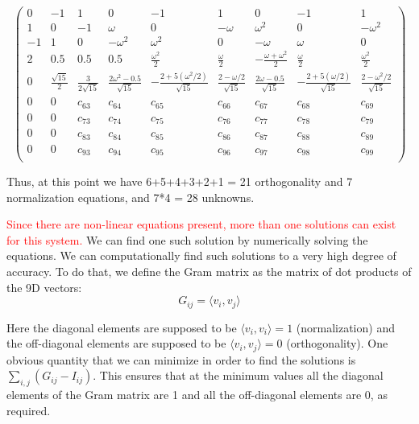 \documentclass{article}
\begin{document}
\[
\begin{pmatrix}
0 & -1 & 1 & 0 & -1 & 1 & 0 & -1 & 1 \\
1 & 0 & -1 & \omega & 0 & -\omega & \omega^2 & 0 & -\omega^2 \\
-1 & 1 & 0 & -\omega^2 & \omega^2 & 0 & -\omega & \omega & 0 \\
2 & 0.5 & 0.5 & 0.5 & \frac{\omega^2}{2} & \frac{\omega}{2} & -\frac{\omega + \omega^2}{2} & \frac{\omega}{2} & \frac{\omega^2}{2} \\
0 & \frac{\sqrt{15}}{2} & \frac{3}{2\sqrt{15}} & \frac{2\omega^2 - 0.5}{\sqrt{15}} & -\frac{2 + 5(\omega^2 / 2)}{\sqrt{15}} & \frac{2 - \omega / 2}{\sqrt{15}} & \frac{2\omega - 0.5}{\sqrt{15}} & -\frac{2 + 5(\omega / 2)}{\sqrt{15}} & \frac{2 - \omega^2 / 2}{\sqrt{15}} \\
0 & 0 & c_{63} & c_{64} & c_{65} & c_{66} & c_{67} & c_{68} & c_{69} \\
0 & 0 & c_{73} & c_{74} & c_{75} & c_{76} & c_{77} & c_{78} & c_{79} \\
0 & 0 & c_{83} & c_{84} & c_{85} & c_{86} & c_{87} & c_{88} & c_{89} \\
0 & 0 & c_{93} & c_{94} & c_{95} & c_{96} & c_{97} & c_{98} & c_{99} \\
\end{pmatrix}
\]




Thus, at this point we have 6+5+4+3+2+1 = 21 orthogonality and 7 normalization equations, and 7*4 = 28 unknowns.

\textcolor{red}{Since there are non-linear equations present, more than one solutions can exist for this system.} We can find one such solution
by numerically solving the equations. We can computationally find such solutions to a very high degree of accuracy. To do that, we define the Gram 
matrix as the matrix of dot products of the 9D vectors:
\begin{equation}
    G_{ij} = \langle v_i, v_j \rangle
\end{equation}

Here the diagonal elements are supposed to be $ \langle v_i, v_i \rangle = 1$ (normalization) and the off-diagonal elements are supposed to be
$ \langle v_i, v_j \rangle = 0$ (orthogonality). One obvious quantity that we can minimize in order to find the solutions 
is $\sum_{i,j} (G_{ij} - I_{ij})$. This ensures that at the minimum values all the diagonal elements of the Gram matrix are 1 and all 
the off-diagonal elements are 0, as required. 
\end{document}
